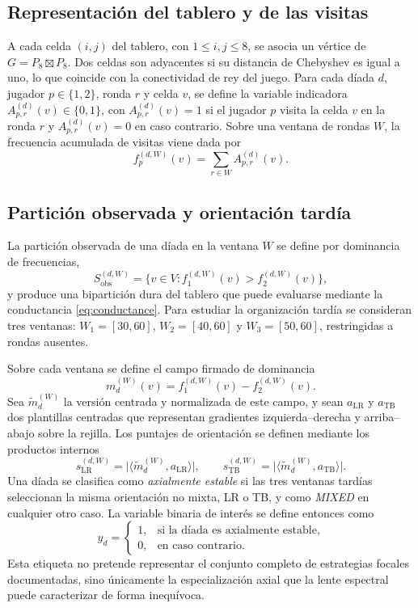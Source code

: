 \documentclass[journal]{IEEEtran}
\newcommand{\Sobs}{S_{\mathrm{obs}}}
\begin{document}
\subsection{Representación del tablero y de las visitas}

A cada celda $(i,j)$ del tablero, con $1 \le i,j \le 8$, se asocia un vértice de $G = P_8 \boxtimes P_8$. Dos celdas son adyacentes si su distancia de Chebyshev es igual a uno, lo que coincide con la conectividad de rey del juego. Para cada díada $d$, jugador $p \in \{1,2\}$, ronda $r$ y celda $v$, se define la variable indicadora $A^{(d)}_{p,r}(v) \in \{0,1\}$, con $A^{(d)}_{p,r}(v) = 1$ si el jugador $p$ visita la celda $v$ en la ronda $r$ y $A^{(d)}_{p,r}(v) = 0$ en caso contrario. Sobre una ventana de rondas $W$, la frecuencia acumulada de visitas viene dada por
\[
f_p^{(d,W)}(v) = \sum_{r \in W} A^{(d)}_{p,r}(v).
\]

\subsection{Partición observada y orientación tardía}

La partición observada de una díada en la ventana $W$ se define por dominancia de frecuencias,
\begin{equation}
\Sobs^{(d,W)} = \bigl\{v \in V : f_1^{(d,W)}(v) > f_2^{(d,W)}(v) \bigr\},
\label{eq:partition}
\end{equation}
y produce una bipartición dura del tablero que puede evaluarse mediante la conductancia \eqref{eq:conductance}. Para estudiar la organización tardía se consideran tres ventanas: $W_1 = [30,60]$, $W_2 = [40,60]$ y $W_3 = [50,60]$, restringidas a rondas ausentes.

Sobre cada ventana se define el campo firmado de dominancia
\[
m_d^{(W)}(v) = f_1^{(d,W)}(v) - f_2^{(d,W)}(v).
\]
Sea $\tilde m_d^{(W)}$ la versión centrada y normalizada de este campo, y sean $a_{\mathrm{LR}}$ y $a_{\mathrm{TB}}$ dos plantillas centradas que representan gradientes izquierda--derecha y arriba--abajo sobre la rejilla. Los puntajes de orientación se definen mediante los productos internos
\[
s_{\mathrm{LR}}^{(d,W)} = \bigl|\langle \tilde m_d^{(W)}, a_{\mathrm{LR}} \rangle\bigr|,
\qquad
s_{\mathrm{TB}}^{(d,W)} = \bigl|\langle \tilde m_d^{(W)}, a_{\mathrm{TB}} \rangle\bigr|.
\]
Una díada se clasifica como \emph{axialmente estable} si las tres ventanas tardías seleccionan la misma orientación no mixta, LR o TB, y como \emph{MIXED} en cualquier otro caso. La variable binaria de interés se define entonces como
\[
y_d = \begin{cases} 1, & \text{si la díada es axialmente estable,}\\ 0, & \text{en caso contrario.}\end{cases}
\]
Esta etiqueta no pretende representar el conjunto completo de estrategias focales documentadas, sino únicamente la especialización axial que la lente espectral puede caracterizar de forma inequívoca.
\end{document}
